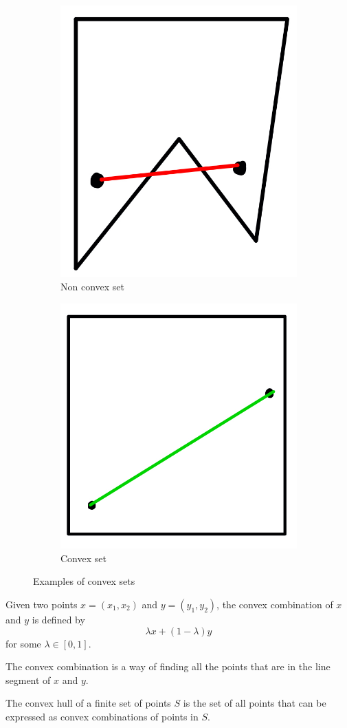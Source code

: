 \begin{figure}[hpt]
\centering
\begin{subfigure}{.5\textwidth}
  \centering
  \includegraphics[width=.4\linewidth]{figures/convex-hull-false}
  \caption{Non convex set}
  \label{fig:convex-1}
\end{subfigure}%
\begin{subfigure}{.5\textwidth}
  \centering
  \includegraphics[width=.4\linewidth]{figures/convex-hull-true}
  \caption{Convex set}
  \label{fig:sub2}
\end{subfigure}
\caption{Examples of convex sets}
\label{fig:test}
\end{figure}


\begin{definition}
    Given two points $x = (x_1, x_2)$ and $y = (y_1, y_2)$, the
    convex combination of $x$ and $y$ is defined by
    $$
    \lambda x + (1 - \lambda)y
    $$
    for some $\lambda \in [0, 1]$.
\end{definition}

The convex combination is a way of finding all the points that are in
the line segment of $x$ and $y$.

\begin{definition}
    The convex hull of a finite set of points $S$ is the set of all
    points that can be expressed as convex combinations of points in
    $S$.
\end{definition}

